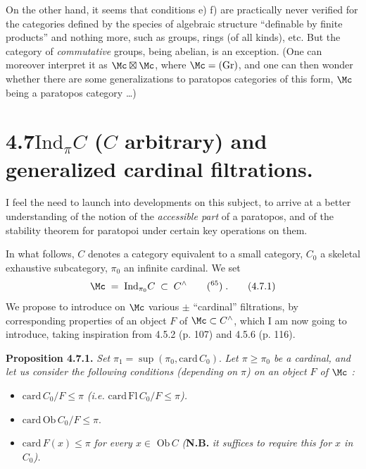 
On the other hand, it seems that conditions e) f) are practically never verified for the categories defined by the species of algebraic structure ``definable by finite products'' and nothing more, such as groups, rings (of all kinds), etc. But the category of \textit{commutative} groups, being abelian, is an exception. (One can moreover interpret it as $\Mc \boxtimes \Mc$, where $\Mc = (\mathrm{Gr})$, and one can then wonder whether there are some generalizations to paratopos categories of this form, $\Mc$ being a paratopos category \ldots) %


\section*{4.7\quad $\mathrm{Ind}_{\pi}C$ ($C$ arbitrary) and generalized cardinal filtrations.}

I feel the need to launch into developments on this subject, to arrive at a better understanding of the notion of the \textit{accessible part} of a paratopos, and of the stability theorem for paratopoi under certain key operations on them.

In what follows, $C$ denotes a category equivalent to a small category, $C_0$ a skeletal exhaustive subcategory, $\pi_0$ an infinite cardinal. We set
\[
\Mc \;=\; \mathrm{Ind}_{\pi_0}C \;\subset\; C^{\wedge} \qquad \text{(\footnotemark[65])}\;. \tag*{(4.7.1)}
\]
We propose to introduce on $\Mc$ various $\pm$ ``cardinal'' filtrations, by corresponding properties of an object $F$ of $\Mc \subset C^{\wedge}$, which I am now going to introduce, taking inspiration from 4.5.2 (p. 107) and 4.5.6 (p. 116).

\textbf{Proposition 4.7.1.} \textit{Set} $\pi_1 = \sup(\pi_0, \mathrm{card}\, C_0)$. \textit{Let $\pi \geqslant \pi_0$ be a cardinal, and let us consider the following conditions (depending on $\pi$) on an object $F$ of $\Mc$ :}
\begin{itemize}[leftmargin=4em]
\item[\textit{a)}] $\mathrm{card}\, C_0/F \leqslant \pi$ \textit{(i.e.} $\mathrm{card}\,\mathrm{Fl}\, C_0/F \leqslant \pi$\textit{).}
\item[\textit{a$'$)}] $\mathrm{card}\,\mathrm{Ob}\, C_0/F \leqslant \pi$.
\item[\textit{a$''$)}] $\mathrm{card}\, F(x) \leqslant \pi$ \textit{for every $x \in$} $\mathrm{Ob}\, C$ \textit{(}\textbf{N.B.} \textit{it suffices to require this for $x$ in $C_0$).}
\end{itemize}


